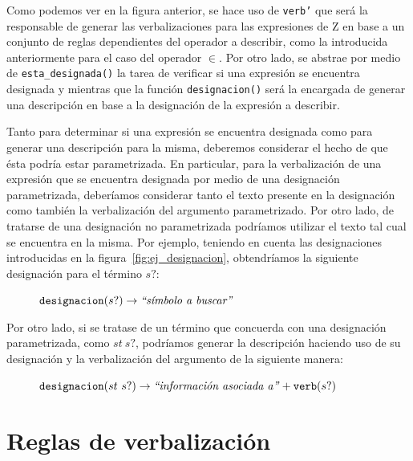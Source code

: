 Como podemos ver en la figura anterior, se hace uso de \texttt{verb'} que será la responsable de generar las verbalizaciones para las expresiones de Z en base a un conjunto de reglas dependientes del operador a describir, como la introducida anteriormente para el caso del operador $\in$. Por otro lado, se abstrae por medio de \texttt{esta\_designada()} la tarea de verificar si una expresión se encuentra designada y mientras que la función \texttt{designacion()} será la encargada de generar una descripción en base a la designación de la expresión a describir. 


Tanto para determinar si una expresión se encuentra designada como para generar una descripción para la misma, deberemos considerar el hecho de que ésta podría estar parametrizada. En particular, para la verbalización de una expresión que se encuentra designada por medio de una designación parametrizada, deberíamos considerar tanto el texto presente en la designación como también la verbalización del argumento parametrizado. Por otro lado, de tratarse de una designación no parametrizada podríamos utilizar el texto tal cual se encuentra en la misma. Por ejemplo, teniendo en cuenta las designaciones introducidas en la figura~\ref{fig:ej_designacion}, obtendríamos la siguiente designación para el término $s?$:

\begin{figure}[H]
\center
$\texttt{designacion}(s?) \rightarrow \text{\emph{``símbolo a buscar''}}$
\end{figure}

\noindent
Por otro lado, si se tratase de un término que concuerda con una designación parametrizada, como $st~s?$, podríamos generar la descripción haciendo uso de su designación y la verbalización del argumento de la siguiente manera: 

\begin{figure}[H]
\center
$\texttt{designacion}(st~s?) \rightarrow \text{\emph{``información asociada a''}} + \texttt{verb}(s?)$
\end{figure}


\section{Reglas de verbalización}
\label{sec:corpus_reglas}

